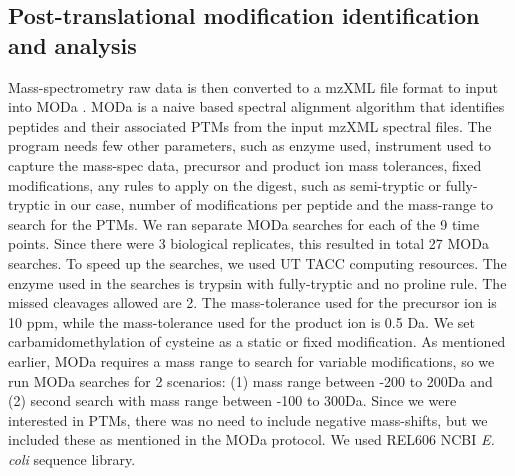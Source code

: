 \documentclass[12pt]{article}
\begin{document}
\subsection{Post-translational modification identification and analysis} 

Mass-spectrometry raw data is then converted to a mzXML file format to input into MODa \cite{Naetal2012}. MODa is a naive based spectral alignment algorithm that identifies peptides and their associated PTMs from the input mzXML spectral files. The program needs few other parameters, such as enzyme used, instrument used to capture the  mass-spec data, precursor and product ion mass tolerances, fixed modifications, any rules to apply on the digest, such as semi-tryptic or fully-tryptic in our case, number of modifications per peptide and the mass-range to search for the PTMs. We ran separate MODa searches for each of the 9 time points. Since there were 3 biological replicates, this resulted in total 27 MODa searches.  To speed up the searches, we used UT TACC computing resources. The enzyme used in the searches is trypsin with fully-tryptic and no proline rule. The missed cleavages allowed are 2. The mass-tolerance used for the precursor ion is 10 ppm, while the mass-tolerance used for the product ion is 0.5 Da. We set carbamidomethylation of cysteine as a static or fixed modification. As mentioned earlier, MODa requires a mass range to search for variable modifications, so we run MODa searches for 2 scenarios: (1) mass range between -200 to 200Da and (2) second search with mass range between -100 to 300Da. Since we were interested in PTMs, there was no need to include negative mass-shifts, but we included these as mentioned in the MODa protocol. We used REL606 NCBI \emph{E. coli} sequence library. 
\end{document}

